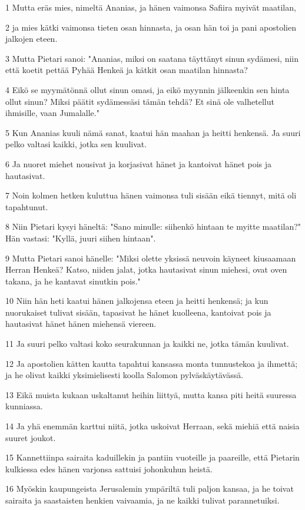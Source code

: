 \par 1 Mutta eräs mies, nimeltä Ananias, ja hänen vaimonsa Safiira myivät maatilan,
\par 2 ja mies kätki vaimonsa tieten osan hinnasta, ja osan hän toi ja pani apostolien jalkojen eteen.
\par 3 Mutta Pietari sanoi: "Ananias, miksi on saatana täyttänyt sinun sydämesi, niin että koetit pettää Pyhää Henkeä ja kätkit osan maatilan hinnasta?
\par 4 Eikö se myymätönnä ollut sinun omasi, ja eikö myynnin jälkeenkin sen hinta ollut sinun? Miksi päätit sydämessäsi tämän tehdä? Et sinä ole valhetellut ihmisille, vaan Jumalalle."
\par 5 Kun Ananias kuuli nämä sanat, kaatui hän maahan ja heitti henkensä. Ja suuri pelko valtasi kaikki, jotka sen kuulivat.
\par 6 Ja nuoret miehet nousivat ja korjasivat hänet ja kantoivat hänet pois ja hautasivat.
\par 7 Noin kolmen hetken kuluttua hänen vaimonsa tuli sisään eikä tiennyt, mitä oli tapahtunut.
\par 8 Niin Pietari kysyi häneltä: "Sano minulle: siihenkö hintaan te myitte maatilan?" Hän vastasi: "Kyllä, juuri siihen hintaan".
\par 9 Mutta Pietari sanoi hänelle: "Miksi olette yksissä neuvoin käyneet kiusaamaan Herran Henkeä? Katso, niiden jalat, jotka hautasivat sinun miehesi, ovat oven takana, ja he kantavat sinutkin pois."
\par 10 Niin hän heti kaatui hänen jalkojensa eteen ja heitti henkensä; ja kun nuorukaiset tulivat sisään, tapasivat he hänet kuolleena, kantoivat pois ja hautasivat hänet hänen miehensä viereen.
\par 11 Ja suuri pelko valtasi koko seurakunnan ja kaikki ne, jotka tämän kuulivat.
\par 12 Ja apostolien kätten kautta tapahtui kansassa monta tunnustekoa ja ihmettä; ja he olivat kaikki yksimielisesti koolla Salomon pylväskäytävässä.
\par 13 Eikä muista kukaan uskaltanut heihin liittyä, mutta kansa piti heitä suuressa kunniassa.
\par 14 Ja yhä enemmän karttui niitä, jotka uskoivat Herraan, sekä miehiä että naisia suuret joukot.
\par 15 Kannettiinpa sairaita kaduillekin ja pantiin vuoteille ja paareille, että Pietarin kulkiessa edes hänen varjonsa sattuisi johonkuhun heistä.
\par 16 Myöskin kaupungeista Jerusalemin ympäriltä tuli paljon kansaa, ja he toivat sairaita ja saastaisten henkien vaivaamia, ja ne kaikki tulivat parannetuiksi.
